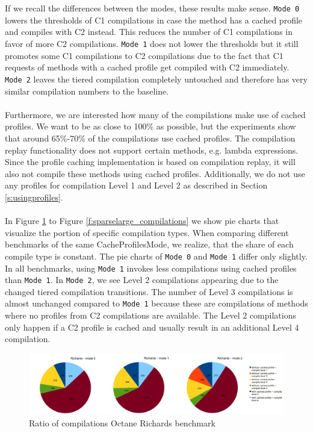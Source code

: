 \\\\
If we recall the differences between the modes, these results make sense. \texttt{Mode 0} lowers the thresholds of C1 compilations in case the method has a cached profile and compiles with C2 instead. This reduces the number of C1 compilations in favor of more C2 compilations. \texttt{Mode 1} does not lower the thresholds but it still promotes some C1 compilations to C2 compilations due to the fact that C1 requests of methods with a cached profile get compiled with C2 immediately.
\texttt{Mode 2} leaves the tiered compilation completely untouched and therefore has very similar compilation numbers to the baseline.
\\\\
Furthermore, we are interested how many of the compilations make use of cached profiles. We want to be as close to 100\% as possible, but the experiments show that around 65\%-70\% of the compilations use cached profiles.
The compilation replay functionality does not support certain methods, e.g. lambda expressions. Since the profile caching implementation is based on compilation replay, it will also not compile these methods using cached profiles. 
Additionally, we do not use any profiles for compilation Level 1 and Level 2 as described in Section \ref{s:usingprofiles}.
\\\\
In Figure \ref{f:richards_compilations} to Figure \ref{f:sparselarge_compilations} we show pie charts that visualize the portion of specific compilation types.
When comparing different benchmarks of the same CacheProfilesMode, we realize, that the share of each compile type is constant.
The pie charts of \texttt{Mode 0} and \texttt{Mode 1} differ only slightly. In all benchmarks, using \texttt{Mode 1} invokes less compilations using cached profiles than \texttt{Mode 1}.
In \texttt{Mode 2}, we see Level 2 compilations appearing due to the changed tiered compilation transitions. The number of Level 3 compilations is almost unchanged compared to \texttt{Mode 1} because these are compilations of methods where no profiles from C2 compilations are available.
The Level 2 compilations only happen if a C2 profile is cached and usually result in an additional Level 4 compilation. 
\begin{figure}[ht]
  \begin{center}
    \centering
    \includegraphics[width=1.0\textwidth]{figures/richards_compilations.png}
    \caption{Ratio of compilations Octane Richards benchmark}
    \label{f:richards_compilations}
  \end{center}
\end{figure}
